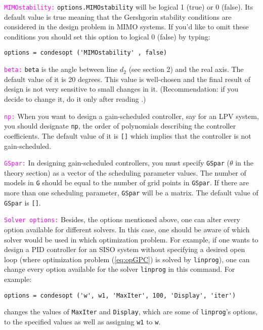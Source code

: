 \documentclass [12pt , a4paper] {article}
\begin{document}
\textcolor{magenta}{\texttt{MIMOstability:}} \texttt{options.MIMOstability} will be logical 1 (true) or 0 (false). Its default value is true meaning that the Gershgorin stability conditions are considered in the design problem in MIMO systems. If you'd like to omit these conditions you should set this option to logical 0 (false) by typing:
\begin{lstlisting}
options = condesopt ('MIMOstability' , false)
\end{lstlisting}

\textcolor{magenta}{\texttt{beta:}} \texttt{beta} is the angle between line $d_2$ (see section 2) and the real axis. The default value of it is 20 degrees. This value is well-chosen and the final result of design is not very sensitive to small changes in it. (Recommendation: if you decide to change it, do it only after reading \cite{KKL07}.)

\textcolor{magenta}{\texttt{np:}} When you want to design a gain-scheduled controller, say for an LPV system, you should designate \texttt{np}, the order of polynomials describing the controller coefficients. The default value of it is \texttt{[]} which implies that the controller is not gain-scheduled.

\textcolor{magenta}{\texttt{GSpar:}} In designing gain-scheduled controllers, you must specify \texttt{GSpar} ($\theta$ in the theory section) as a vector of the scheduling parameter values. The number of models in \texttt{G} should be equal to the number of grid points in \texttt{GSpar}. If there are more than one scheduling parameter, \texttt{GSpar} will be a matrix. The default value of \texttt{GSpar} is \texttt{[]}.

\textcolor{magenta}{\texttt{Solver options:}} Besides, the options mentioned above, one can alter every option available for different solvers. In this case, one should be aware of which solver would be used in which optimization problem. For example, if one wants to design a PID controller for an SISO system without specifying a desired open loop (where optimization problem (\ref{eq:opGPC}) is solved by \texttt{linprog}), one can change every option available for the solver \texttt{linprog} in this command. For example:
\begin{lstlisting}
options = condesopt ('w', w1, 'MaxIter', 100, 'Display', 'iter')
\end{lstlisting}
changes the values of \texttt{MaxIter} and \texttt{Display}, which are some of \texttt{linprog}'s options, to the specified values as well as assigning \texttt{w1} to \texttt{w}.
\end{document}
